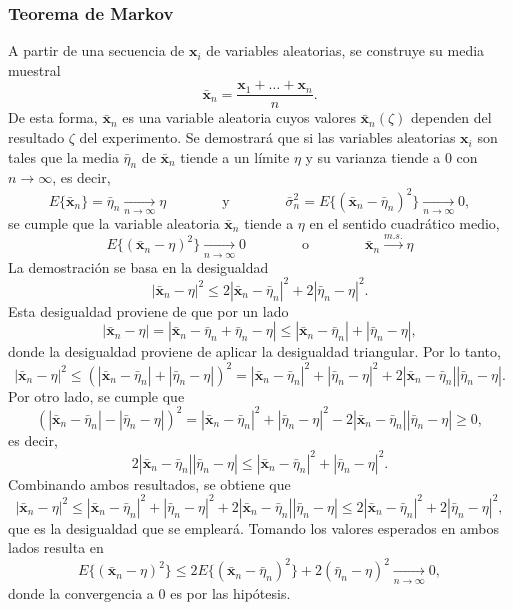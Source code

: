 \documentclass[a4paper]{report}
\newcommand{\x}{\mathbf{x}}
\begin{document}
\subsubsection{Teorema de Markov}

A partir de una secuencia de \(\x_i\) de variables aleatorias, se construye su media muestral
\[
 \bar{\x}_n=\frac{\x_1+\dots+\x_n}{n}.
\]
De esta forma, \(\bar{\x}_n\) es una variable aleatoria cuyos valores \(\bar{\x}_n(\zeta)\) dependen del resultado \(\zeta\) del experimento. Se demostrará que si las variables aleatorias \(\x_i\) son tales que la media \(\bar{\eta}_n\) de \(\bar{\x}_n\) tiende a un límite \(\eta\) y su varianza tiende a 0 con \(n\to\infty\), es decir,
\[
 E\{\bar{\x}_n\}=\bar{\eta}_n\xrightarrow[n\to\infty]{}\eta
  \qquad\qquad\textrm{y}\qquad\qquad
 \bar{\sigma}_n^2=E\{(\bar{\x}_n-\bar{\eta}_n)^2\}\xrightarrow[n\to\infty]{}0, 
\]
se cumple que la variable aleatoria \(\bar{\x}_n\) tiende a \(\eta\) en el sentido cuadrático medio,
\[
 E\{(\bar{\x}_n-\eta)^2\}\xrightarrow[n\to\infty]{}0
 \qquad\qquad\textrm{o}\qquad\qquad
 \bar{\x}_n\xrightarrow[]{m.s.}\eta
\]
La demostración se basa en la desigualdad
\[
 |\bar{\x}_n-\eta|^2\leq2|\bar{\x}_n-\bar{\eta}_n|^2+2|\bar{\eta}_n-\eta|^2.
\]
Esta desigualdad proviene de que por un lado
\[
 |\bar{\x}_n-\eta|=|\bar{\x}_n-\bar{\eta}_n+\bar{\eta}_n-\eta|\leq|\bar{\x}_n-\bar{\eta}_n|+|\bar{\eta}_n-\eta|,
\]
donde la desigualdad proviene de aplicar la desigualdad triangular. Por lo tanto,
\[
 |\bar{\x}_n-\eta|^2\leq(|\bar{\x}_n-\bar{\eta}_n|+|\bar{\eta}_n-\eta|)^2=|\bar{\x}_n-\bar{\eta}_n|^2+|\bar{\eta}_n-\eta|^2+2|\bar{\x}_n-\bar{\eta}_n||\bar{\eta}_n-\eta|.
\]
Por otro lado, se cumple que
\[
 (|\bar{\x}_n-\bar{\eta}_n|-|\bar{\eta}_n-\eta|)^2=|\bar{\x}_n-\bar{\eta}_n|^2+|\bar{\eta}_n-\eta|^2-2|\bar{\x}_n-\bar{\eta}_n||\bar{\eta}_n-\eta|\geq0,
\]
es decir,
\[
 2|\bar{\x}_n-\bar{\eta}_n||\bar{\eta}_n-\eta|\leq|\bar{\x}_n-\bar{\eta}_n|^2+|\bar{\eta}_n-\eta|^2.
\]
Combinando ambos resultados, se obtiene que
\[
 |\bar{\x}_n-\eta|^2\leq|\bar{\x}_n-\bar{\eta}_n|^2+|\bar{\eta}_n-\eta|^2+2|\bar{\x}_n-\bar{\eta}_n||\bar{\eta}_n-\eta|\leq2|\bar{\x}_n-\bar{\eta}_n|^2+2|\bar{\eta}_n-\eta|^2,
\]
que es la desigualdad que se empleará. Tomando los valores esperados en ambos lados resulta en
\[
 E\{(\bar{\x}_n-\eta)^2\}\leq2E\{(\bar{\x}_n-\bar{\eta}_n)^2\}+2(\bar{\eta}_n-\eta)^2\xrightarrow[n\to\infty]{}0,
\]
donde la convergencia a 0 es por las hipótesis. 
\end{document}
